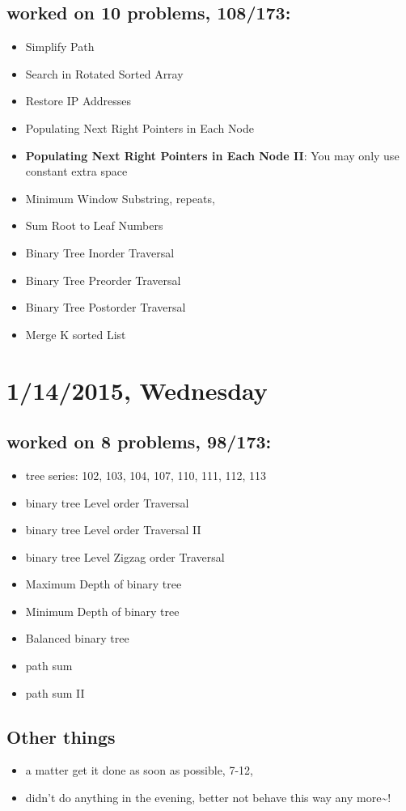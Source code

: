 \documentclass[9pt,b5paper]{article}
\begin{document}
\subsection{worked on 10 problems, 108/173:}
\label{sec-11-1}
\begin{itemize}
\item Simplify Path
\item Search in Rotated Sorted Array
\item Restore IP Addresses
\item Populating Next Right Pointers in Each Node
\item \textbf{Populating Next Right Pointers in Each Node II}: You may only use constant extra space
\item Minimum Window Substring, repeats,
\item Sum Root to Leaf Numbers
\item Binary Tree Inorder Traversal
\item Binary Tree Preorder Traversal
\item Binary Tree Postorder Traversal
\item Merge K sorted List
\end{itemize}
\section{1/14/2015, Wednesday}
\label{sec-12}
\subsection{worked on 8 problems, 98/173:}
\label{sec-12-1}
\begin{itemize}
\item tree series: 102, 103, 104, 107, 110, 111, 112, 113
\item binary tree Level order Traversal
\item binary tree Level order Traversal II
\item binary tree Level Zigzag order Traversal
\item Maximum Depth of binary tree
\item Minimum Depth of binary tree
\item Balanced binary tree
\item path sum
\item path sum II
\end{itemize}
\subsection{Other things}
\label{sec-12-2}
\begin{itemize}
\item a matter get it done as soon as possible, 7-12,
\item didn't do anything in the evening, better not behave this way any more\textasciitilde{}!
\end{itemize}
\end{document}
